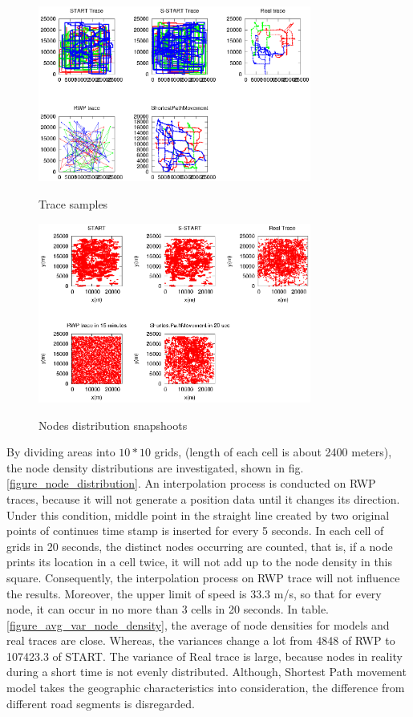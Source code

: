 \begin{figure}[htbp]
\centering
\includegraphics[width=0.8\textwidth]{figures_201103/Evaluation/ev_tracesample.eps}\\
\caption{Trace samples}\label{figure_tracesample}
\end{figure}


\begin{figure}[htbp]
\centering
\includegraphics[width=0.8\textwidth]{figures_201103/Evaluation/ev_tracesnapshoots.eps}\\
\caption{Nodes distribution snapshoots}\label{figure_tracesnapshoots}
\end{figure}

By dividing areas into $10*10$ grids, (length of each cell is about 2400 meters), the node density distributions are investigated, shown in fig.\ref{figure_node_distribution}. An interpolation process is conducted on RWP traces, because it will not generate a position data until it changes its direction. Under this condition, middle point in the straight line created by two original points of continues time stamp is inserted for every 5 seconds. In each cell of grids in 20 seconds, the distinct nodes occurring are counted, that is, if a node prints its location in a cell twice, it will not add up to the node density in this square. Consequently, the interpolation process on RWP trace will not influence the results. Moreover, the upper limit of speed is 33.3 m/s, so that for every node, it can occur in no more than 3 cells in 20 seconds.  In table. \ref{figure_avg_var_node_density}, the average of node densities for models and real traces are close. Whereas, the variances change a lot from 4848 of RWP to 107423.3 of START. The variance of Real trace is large, because nodes in reality during a short time is not evenly distributed. Although, Shortest Path movement model takes the geographic characteristics into consideration, the difference from different road segments is disregarded.


